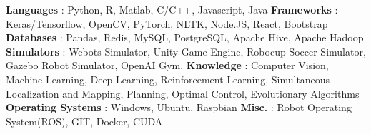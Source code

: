 \begin{cventries}  
\skillentry
    {
    \space \textbf{Languages} : Python, R, Matlab, C/C++, Javascript, Java
    \space \textbf{Frameworks} : Keras/Tensorflow, OpenCV, PyTorch, NLTK, Node.JS, React, Bootstrap
    \space \textbf{Databases} : Pandas, Redis, MySQL, PostgreSQL, Apache Hive, Apache Hadoop
    \space \textbf{Simulators} : Webots Simulator, Unity Game Engine, Robocup Soccer Simulator, Gazebo Robot Simulator, OpenAI Gym,
    \space \textbf{Knowledge} : Computer Vision, Machine Learning, Deep Learning, Reinforcement Learning, Simultaneous Localization and Mapping, Planning, Optimal Control, Evolutionary Algorithms
    \space \textbf{Operating Systems} : Windows, Ubuntu, Raspbian 
    \space \textbf{Misc.} : Robot Operating System(ROS), GIT, Docker, CUDA
    }
    

\end{cventries}
\vspace{0.5 cm}
